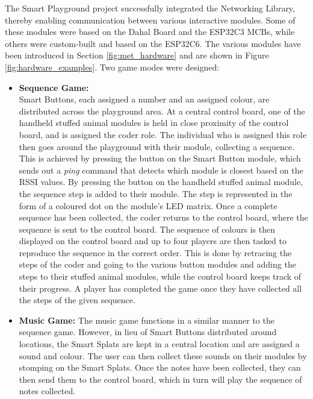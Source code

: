 The Smart Playground project successfully integrated the Networking Library, thereby enabling communication between various interactive modules. Some of these modules were based on the Dahal Board and the ESP32C3 MCBs, while others were custom-built and based on the ESP32C6. The various modules have been introduced in Section \ref{fig:met_hardware} and are shown in Figure \ref{fig:hardware_examples}. Two game modes were designed:
\begin{itemize}
    \item \textbf{Sequence Game:}\\
    Smart Buttons, each assigned a number and an assigned colour, are distributed across the playground area. At a central control board, one of the handheld stuffed animal modules is held in close proximity of the control board, and is assigned the coder role. The individual who is assigned this role then goes around the playground with their module, collecting a sequence. This is achieved by pressing the button on the Smart Button module, which sends out a \textit{ping} command that detects which module is closest based on the RSSI values. By pressing the button on the handheld stuffed animal module, the sequence step is added to their module. The step is represented in the form of a coloured dot on the module's LED matrix. Once a complete sequence has been collected, the coder returns to the control board, where the sequence is sent to the control board. The sequence of colours is then displayed on the control board and up to four players are then tasked to reproduce the sequence in the correct order. This is done by retracing the steps of the coder and going to the various button modules and adding the steps to their stuffed animal modules, while the control board keeps track of their progress. A player has completed the game once they have collected all the steps of the given sequence.
    \item \textbf{Music Game:}
    The music game functions in a similar manner to the sequence game. However, in lieu of Smart Buttons distributed around locations, the Smart Splats are kept in a central location and are assigned a sound and colour. The user can then collect these sounds on their modules by stomping on the Smart Splats. Once the notes have been collected, they can then send them to the control board, which in turn will play the sequence of notes collected.
\end{itemize}


